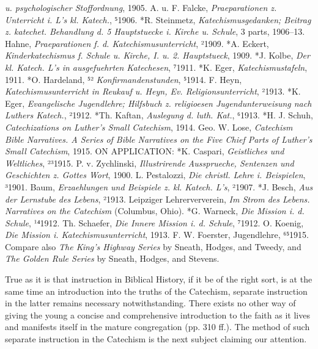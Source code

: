 \emph{u. psychologischer Stoffordnung}, 1905. A. u. F. Falcke, \emph{Praeparationen z. Unterricht i. L’s kl. Katech.}, ⁵1906. *R. Steinmetz, \emph{Katechismusgedanken; Beitrag z. katechet. Behandlung d. 5 Hauptstuecke i. Kirche u. Schule}, 3 parts, 1906–13. Hahne, \emph{Praeparationen f. d. Katechismusunterricht}, ²1909. *A. Eckert, \emph{Kinderkatechismus f. Schule u. Kirche, I. u. 2. Hauptstueck}, 1909. *J. Kolbe, \emph{Der kl. Katech. L’s in ausgefuehrten Katechesen}, ⁷1911. *K. Eger, \emph{Katechismustafeln}, 1911. *O. Hardeland, ⁵² \emph{Konfirmandenstunden}, ⁵1914. F. Heyn, \emph{Katechismusunterricht in Reukauf u. Heyn, Ev. Religionsunterricht}, ²1913. *K. Eger, \emph{Evangelische \emph{Jugendlehre}; Hilfsbuch z. religioesen Jugendunterweisung nach Luthers Katech.}, ²1912. *Th. Kaftan, \emph{Auslegung d. luth. Kat.}, ⁶1913. *H. J. Schuh, \emph{Catechizations on Luther’s Small Catechism}, 1914. Geo. W. Lose, \emph{Catechism Bible Narratives. A Series of Bible Narratives on the Five Chief Parts of Luther’s Small Catechism}, 1915. ON APPLICATION: *K. Caspari, \emph{Geistliches und Weltliches}, ²³1915. P. v. Zychlinski, \emph{Illustrirende Aussprueche, Sentenzen und Geschichten z. Gottes Wort}, 1900. L. Pestalozzi, \emph{Die christl. Lehre i. Beispielen}, ³1901. Baum, \emph{Erzaehlungen und Beispiele z. kl. Katech. L’s}, ²1907. *J. Besch, \emph{Aus der Lernstube des Lebens}, ²1913. Leipziger Lehrerververein, \emph{Im Strom des Lebens. Narratives on the Catechism} (Columbus, Ohio). *G. Warneck, \emph{Die Mission i. d. Schule}, ¹⁴1912. Th. Schaefer, \emph{Die Innere Mission i. d. Schule}, ⁷1912. O. Koenig, \emph{Die Mission i. Katechismusunterricht}, 1913. F. W. Foerster, Jugendlehre, ⁶⁵1915. Compare also \emph{The King’s Highway Series} by Sneath, Hodges, and Tweedy, and \emph{The Golden Rule Series} by Sneath, Hodges, and Stevens.

True as it is that instruction in Biblical History, if it be of the right sort, is at the same time an introduction into the truths of the Catechism, separate instruction in the latter remains necessary notwithstanding. There exists no other way of giving the young a concise and comprehensive introduction to the faith as it lives and manifests itself in the mature congregation (pp. 310 ff.). The method of such separate instruction in the Catechism is the next subject claiming our attention.


